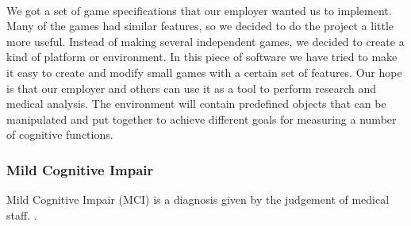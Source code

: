 \\
We got a set of game specifications that our employer wanted us to implement.
Many of the games had similar features, so we decided to do the project a
little more useful.
Instead of making several independent games, we decided to create a kind of 
platform or environment. In this piece of software we have tried to make it
easy to create and modify small games with a certain set of features. Our
hope is that our employer and others can use it as a tool to perform research
and medical analysis. The environment will contain predefined objects that
can be manipulated and put together to achieve different goals for measuring
a number of cognitive functions.

\subsubsection{Mild Cognitive Impair}

Mild Cognitive Impair (MCI) is a diagnosis given by the judgement of medical 
staff.
\cite{MCI_alzOrg}.
